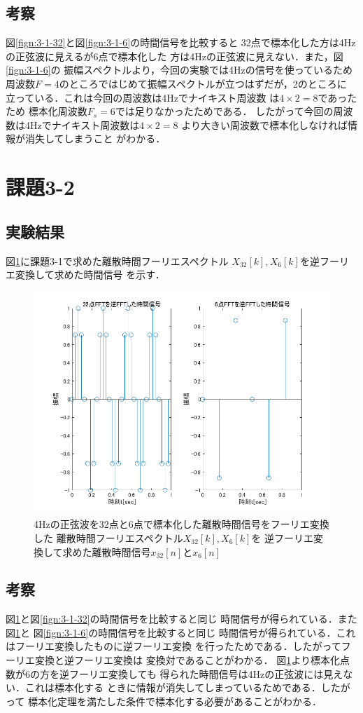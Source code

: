 \documentclass[11pt, a4paper, titlepage]{ltjsarticle}
\begin{document}
\subsection*{考察}
図\ref*{fign:3-1-32}と図\ref*{fign:3-1-6}の時間信号を比較すると
32点で標本化した方は4Hzの正弦波に見えるが6点で標本化した
方は4Hzの正弦波に見えない．また，図\ref*{fign:3-1-6}の
振幅スペクトルより，今回の実験では4Hzの信号を使っているため
周波数$F=4$のところではじめて振幅スペクトルが立つはずだが，2のところに
立っている．これは今回の周波数は4Hzでナイキスト周波数
は$4\times 2 = 8$であったため
標本化周波数$F_{s}=6$では足りなかったためである．
したがって今回の周波数は4Hzでナイキスト周波数は$4\times 2 = 8$
より大きい周波数で標本化しなければ情報が消失してしまうこと
がわかる．



\newpage
\section*{課題3-2}
\subsection*{実験結果}
図\ref*{fign:3-2}に課題3-1で求めた離散時間フーリエスペクトル
$X_{32}[k],X_{6}[k]$を逆フーリエ変換して求めた時間信号
を示す．
\begin{figure}[h]
    \centering
    \includegraphics[width=0.9\linewidth]{figures/3-2.png}
    \caption{4Hzの正弦波を32点と6点で標本化した離散時間信号をフーリエ変換した
    離散時間フーリエスペクトル$X_{32}[k],X_{6}[k]$を
    逆フーリエ変換して求めた離散時間信号$x_{32}[n]$と$x_{6}[n]$}
    \label{fign:3-2}     
\end{figure}
\subsection*{考察}
図\ref*{fign:3-2}と図\ref*{fign:3-1-32}の時間信号を比較すると同じ
時間信号が得られている．また図\ref*{fign:3-2}と
図\ref*{fign:3-1-6}の時間信号を比較すると同じ
時間信号が得られている．これはフーリエ変換したものに逆フーリエ変換
を行ったためである．したがってフーリエ変換と逆フーリエ変換は
変換対であることがわかる．
図\ref*{fign:3-2}より標本化点数が6の方を逆フーリエ変換しても
得られた時間信号は4Hzの正弦波には見えない．これは標本化する
ときに情報が消失してしまっているためである．したがって
標本化定理を満たした条件で標本化する必要があることがわかる．
\end{document}
